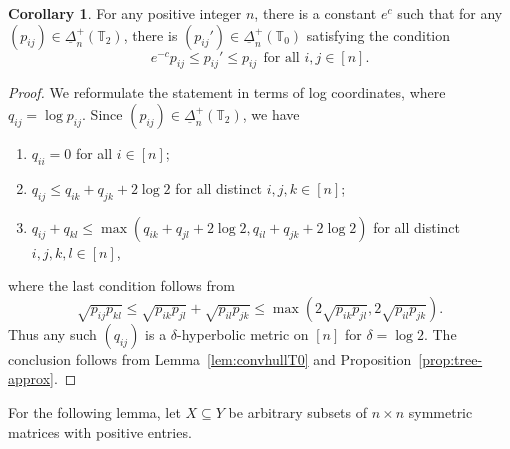 \documentclass{amsart}
\theoremstyle{definition}
\newtheorem{corollary}[theorem]{Corollary}
\theoremstyle{remark}
\def\T{\mathbb{T}}
\begin{document}
\begin{corollary}
\label{lem:finite-hausdorff}
For any positive integer $n$, there is a constant $e^c$ such that
	for any $(p_{ij})\in \underline{\Delta}_n^+(\T_2)$, there is $(p_{ij}')\in \underline{\Delta}_n^+(\T_0)$ satisfying the condition
	\[e^{-c}p_{ij}\le p_{ij}' \le p_{ij}\ \ \text{for all }i,j\in [n].\]
\end{corollary}
\begin{proof}
	We reformulate the statement in terms of log coordinates, where $q_{ij}=\log p_{ij}$. Since $(p_{ij})\in \underline{\Delta}_n^+(\T_2)$, we have 
	\begin{enumerate}[(1)]\itemsep 5pt
	\item $q_{ii}=0$ for all $i\in [n]$;
\item $q_{ij}\leq q_{ik}+q_{jk}+2\log 2$ for all distinct $i,j,k\in [n]$;
\item $q_{ij}+q_{kl}\leq \max(q_{ik}+q_{jl}+2\log2, q_{il}+q_{jk}+2\log 2)$ for all distinct $i,j,k,l\in [n]$,
	\end{enumerate}
	where the last condition follows from 
    \[
    \sqrt{p_{ij}p_{kl}}\leq \sqrt{p_{ik}p_{jl}}+\sqrt{p_{il}p_{jk}}\leq \max(2\sqrt{p_{ik}p_{jl}}, 2\sqrt{p_{il}p_{jk}}).
    \]
Thus any such $(q_{ij})$ is a $\delta$-hyperbolic metric on $[n]$ for $\delta=\log 2$. The conclusion follows from
	Lemma~\ref{lem:convhullT0}  and Proposition~\ref{prop:tree-approx}.
\end{proof}

For the following lemma, let $X\subseteq Y$ be arbitrary subsets of $n \times n$ symmetric matrices with positive entries.
\end{document}
